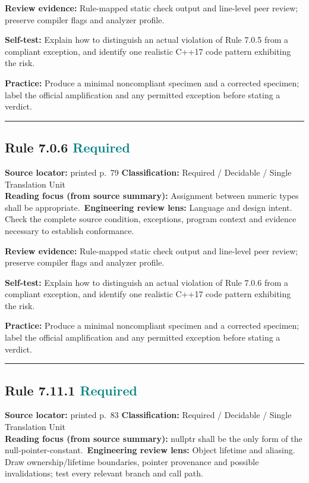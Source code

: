 \documentclass[10pt,letterpaper]{article}
\begin{document}
\textbf{Review evidence:} Rule-mapped static check output and line-level peer review; preserve compiler flags and analyzer profile.

\textbf{Self-test:} Explain how to distinguish an actual violation of Rule 7.0.5 from a compliant exception, and identify one realistic C++17 code pattern exhibiting the risk.\par
\textbf{Practice:} Produce a minimal noncompliant specimen and a corrected specimen; label the official amplification and any permitted exception before stating a verdict.
\smallskip\hrule\smallskip
\subsection*{Rule 7.0.6 \enspace \texorpdfstring{\small\textcolor{teal}{Required}}{Required}}
\noindent\textbf{Source locator:} printed p.~79 \quad\textbf{Classification:} Required / Decidable / Single Translation Unit\\
\textbf{Reading focus (from source summary):} Assignment between numeric types shall be appropriate.\
\textbf{Engineering review lens:} Language and design intent. Check the complete source condition, exceptions, program context and evidence necessary to establish conformance.

\textbf{Review evidence:} Rule-mapped static check output and line-level peer review; preserve compiler flags and analyzer profile.

\textbf{Self-test:} Explain how to distinguish an actual violation of Rule 7.0.6 from a compliant exception, and identify one realistic C++17 code pattern exhibiting the risk.\par
\textbf{Practice:} Produce a minimal noncompliant specimen and a corrected specimen; label the official amplification and any permitted exception before stating a verdict.
\smallskip\hrule\smallskip
\subsection*{Rule 7.11.1 \enspace \texorpdfstring{\small\textcolor{teal}{Required}}{Required}}
\noindent\textbf{Source locator:} printed p.~83 \quad\textbf{Classification:} Required / Decidable / Single Translation Unit\\
\textbf{Reading focus (from source summary):} nullptr shall be the only form of the null-pointer-constant.\
\textbf{Engineering review lens:} Object lifetime and aliasing. Draw ownership/lifetime boundaries, pointer provenance and possible invalidations; test every relevant branch and call path.
\end{document}
